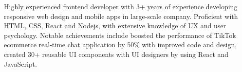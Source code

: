 

\begin{cvparagraph}


Highly experienced frontend developer with 3+ years of experience developing responsive web design and mobile apps in large-scale company. Proficient with HTML, CSS, React and Nodejs, with extensive knowledge of UX and user psychology. Notable achievements include boosted the performance of TikTok ecommerce real-time chat application by 50\% with improved code and design, created 30+ reusable UI components with UI designers by using React and JavaScript.
\end{cvparagraph}